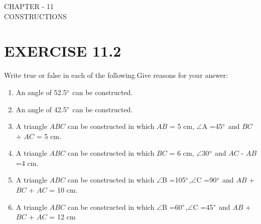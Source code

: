 \documentclass{article}
\begin{document}
\begin{center}
\textbf\large{CHAPTER - 11 \\ CONSTRUCTIONS}
\section*{EXERCISE 11.2}
\end{center}

Write true or false in each of the following.Give reasons for your answer:
\begin{enumerate}
\item An angle of 52.5$\degree$ can be constructed.
\item An angle of 42.5$\degree$ can be constructed.                                         \item A triangle $ABC$ can be constructed in which $AB$ = 5 cm, $\angle$A =45$\degree$ and $BC$ + $AC$ = 5 cm.
\item A triangle $ABC$ can be constructed in which $BC$ = 6 cm, $\angle$30$\degree$ and $AC$ - $AB$=4 cm.
\item A triangle $ABC$ can be constructed in which $\angle$B =105$\degree$,$\angle$C =90$\degree$ and $AB$ + $BC$ + $AC$ = 10 cm.        
\item A triangle $ABC$ can be constructed in which $\angle$B =60$\degree$,$\angle$C =45$\degree$ and $AB$ + $BC$ + $AC$ = 12 cm           \end{enumerate}                               
\end{document}
